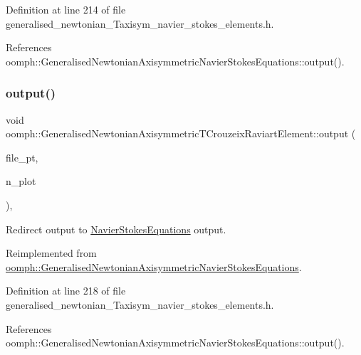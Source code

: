 Definition at line 214 of file generalised\+\_\+newtonian\+\_\+\+Taxisym\+\_\+navier\+\_\+stokes\+\_\+elements.\+h.



References oomph\+::\+Generalised\+Newtonian\+Axisymmetric\+Navier\+Stokes\+Equations\+::output().

\mbox{\label{classoomph_1_1GeneralisedNewtonianAxisymmetricTCrouzeixRaviartElement_a09c3f2cc2d733be8b96daa8e8f8b90cd}} 
\subsubsection{\texorpdfstring{output()}{output()}\hspace{0.1cm}{\footnotesize\ttfamily [4/4]}}
{\footnotesize\ttfamily void oomph\+::\+Generalised\+Newtonian\+Axisymmetric\+T\+Crouzeix\+Raviart\+Element\+::output (\begin{DoxyParamCaption}\item[{F\+I\+LE $\ast$}]{file\+\_\+pt,  }\item[{const unsigned \&}]{n\+\_\+plot }\end{DoxyParamCaption})\hspace{0.3cm}{\ttfamily [inline]}, {\ttfamily [virtual]}}



Redirect output to \hyperlink{classoomph_1_1NavierStokesEquations}{Navier\+Stokes\+Equations} output. 



Reimplemented from \hyperlink{classoomph_1_1GeneralisedNewtonianAxisymmetricNavierStokesEquations_a9aae32c881c1c55c2d20c579bf5438f7}{oomph\+::\+Generalised\+Newtonian\+Axisymmetric\+Navier\+Stokes\+Equations}.



Definition at line 218 of file generalised\+\_\+newtonian\+\_\+\+Taxisym\+\_\+navier\+\_\+stokes\+\_\+elements.\+h.



References oomph\+::\+Generalised\+Newtonian\+Axisymmetric\+Navier\+Stokes\+Equations\+::output().

